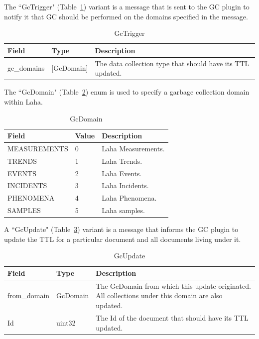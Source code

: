 The ``GcTrigger" (Table~\ref{table:GcTrigger}) variant is a message that is sent to the GC plugin to notify it that GC should be performed on the domains specified in the message.

\begin{table}[H]
	\centering
	\caption{GcTrigger}
	\begin{tabularx}{\textwidth}{llX}
		\toprule
		\textbf{Field} & \textbf{Type} & \textbf{Description} \\
		\midrule
		gc\_domains & [GcDomain] & The data collection type that should have its TTL updated.  \\
		\bottomrule
	\end{tabularx}
	\label{table:GcTrigger}
\end{table}

The ``GcDomain" (Table~\ref{table:GcDomain}) enum is used to specify a garbage collection domain within Laha.

\begin{table}[H]
	\centering
	\caption{GcDomain}
	\begin{tabularx}{\textwidth}{lll}
		\toprule
		\textbf{Field} & \textbf{Value} & \textbf{Description} \\
		\midrule
		MEASUREMENTS & 0 & Laha Measurements.  \\
		TRENDS & 1 & Laha Trends. \\
		EVENTS & 2 & Laha Events. \\
		INCIDENTS & 3 & Laha Incidents. \\
		PHENOMENA & 4 & Laha Phenomena. \\
		SAMPLES & 5 & Laha samples. \\
		\bottomrule
	\end{tabularx}
	\label{table:GcDomain}
\end{table}

A ``GcUpdate" (Table~\ref{table:GcUpdate}) variant is a message that informs the GC plugin to update the TTL for a particular document and all documents living under it.

\begin{table}[H]
	\centering
	\caption{GcUpdate}
	\begin{tabularx}{\textwidth}{llX}
		\toprule
		\textbf{Field} & \textbf{Type} & \textbf{Description} \\
		\midrule
		from\_domain & GcDomain & The GcDomain from which this update originated. All collections under this domain are also updated.  \\
		Id & uint32 & The Id of the document that should have its TTL updated. \\
		\bottomrule
	\end{tabularx}
	\label{table:GcUpdate}
\end{table}

